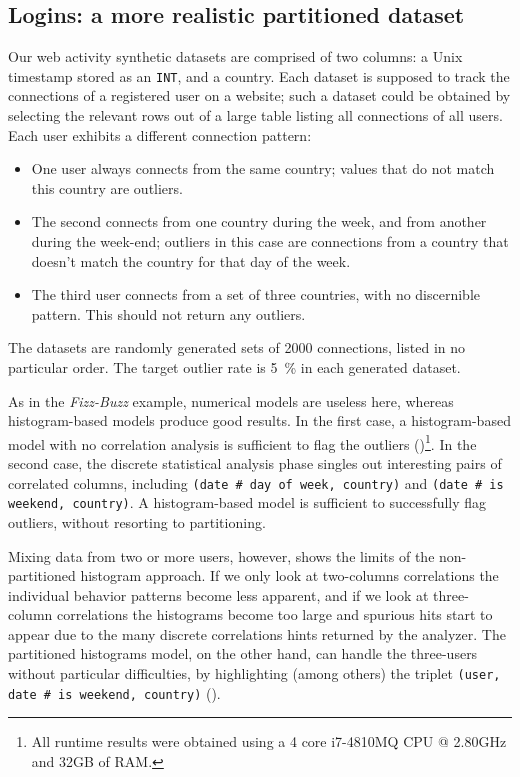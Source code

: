 \subsection{Logins: a more realistic partitioned dataset}

Our web activity synthetic datasets are comprised of two columns: a Unix timestamp stored as an \texttt{INT}, and a country. Each dataset is supposed to track the connections of a registered user on a website; such a dataset could be obtained by selecting the relevant rows out of a large table listing all connections of all users. Each user exhibits a different connection pattern:

\begin{itemize}
\item One user always connects from the same country; values that do not match this country are outliers.
\item The second connects from one country during the week, and from another during the week-end; outliers in this case are connections from a country that doesn't match the country for that day of the week.
\item The third user connects from a set of three countries, with no discernible pattern. This should not return any outliers.
\end{itemize}

The datasets are randomly generated sets of 2000 connections, listed in no particular order. The target outlier rate is \SI{5}{\percent} in each generated dataset.

\newcommand{\prop}[2]{#1\,\#\,#2}

As in the \emph{Fizz-Buzz} example, numerical models are useless here, whereas histogram-based models produce good results. In the first case, a histogram-based model with no correlation analysis is sufficient to flag the outliers ()\footnote{All runtime results were obtained using a 4 core i7-4810MQ CPU @ 2.80GHz and 32GB of RAM.}. In the second case, the discrete statistical analysis phase singles out interesting pairs of correlated columns, including \texttt{(\prop{date}{day of week}, country)} and \texttt{(\prop{date}{is weekend}, country)}. A histogram-based model is sufficient to successfully flag outliers, without resorting to partitioning.


Mixing data from two or more users, however, shows the limits of the non-partitioned histogram approach. If we only look at two-columns correlations the individual behavior patterns become less apparent, and if we look at three-column correlations the histograms become too large and spurious hits start to appear due to the many discrete correlations hints returned by the analyzer. The partitioned histograms model, on the other hand, can handle the three-users without particular difficulties, by highlighting (among others) the triplet \texttt{(user, \prop{date}{is weekend}, country)} ().